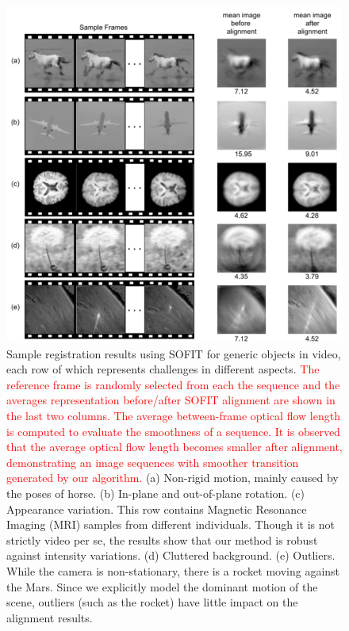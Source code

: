 \documentclass[10pt,journal]{IEEEtran}
\newcommand{\Songfan}[1]{\textcolor{red}{#1}}
\begin{document}
\begin{figure}[htbp]
	\centering
		\includegraphics[width=.65\textwidth]{fig/object_ex}
	\caption{Sample registration results using SOFIT for generic objects in video, each row of which represents challenges in different aspects. \Songfan{The reference frame is randomly selected from each the sequence and the averages representation before/after SOFIT alignment are shown in the last two columns. The average between-frame optical flow length is computed to evaluate the smoothness of a sequence. It is observed that the average optical flow length becomes smaller after alignment, demonstrating an image sequences with smoother transition generated by our algorithm.} (a) Non-rigid motion, mainly caused by the poses of horse. (b) In-plane and out-of-plane rotation. (c) Appearance variation. This row contains Magnetic Resonance Imaging (MRI) samples from different individuals. Though it is not strictly video per se, the results show that our method is robust against intensity variations. (d) Cluttered background. (e) Outliers. While the camera is non-stationary, there is a rocket moving against the Mars. Since we explicitly model the dominant motion of the scene, outliers (such as the rocket) have little impact on the alignment results.}
	\label{fig:object_ex}
\end{figure}
\end{document}
